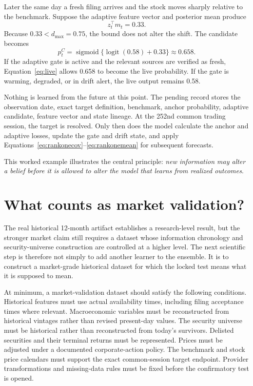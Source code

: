 \documentclass[11pt]{article}
\newcommand{\sigmoid}{\operatorname{sigmoid}}
\newcommand{\logit}{\operatorname{logit}}
\begin{document}
Later the same day a fresh filing arrives and the stock moves sharply relative to the benchmark. Suppose the adaptive feature vector and posterior mean produce
\begin{equation}
z_t^\top m_t=0.33.
\end{equation}
Because $0.33<d_{\max}=0.75$, the bound does not alter the shift. The candidate becomes
\begin{equation}
p_t^C=\sigmoid\{\logit(0.58)+0.33\}\approx0.658.
\end{equation}
If the adaptive gate is active and the relevant sources are verified as fresh, Equation~\eqref{eq:live} allows 0.658 to become the live probability. If the gate is warming, degraded, or in drift alert, the live output remains 0.58.

Nothing is learned from the future at this point. The pending record stores the observation date, exact target definition, benchmark, anchor probability, adaptive candidate, feature vector and state lineage. At the 252nd common trading session, the target is resolved. Only then does the model calculate the anchor and adaptive losses, update the gate and drift state, and apply Equations~\eqref{eq:rankonecov}--\eqref{eq:rankonemean} for subsequent forecasts.

This worked example illustrates the central principle: \emph{new information may alter a belief before it is allowed to alter the model that learns from realized outcomes}.

\section{What counts as market validation?}
\label{sec:realvalidation}

The real historical 12-month artifact establishes a research-level result, but the stronger market claim still requires a dataset whose information chronology and security-universe construction are controlled at a higher level. The next scientific step is therefore not simply to add another learner to the ensemble. It is to construct a market-grade historical dataset for which the locked test means what it is supposed to mean.

At minimum, a market-validation dataset should satisfy the following conditions. Historical features must use actual availability times, including filing acceptance times where relevant. Macroeconomic variables must be reconstructed from historical vintages rather than revised present-day values. The security universe must be historical rather than reconstructed from today's survivors. Delisted securities and their terminal returns must be represented. Prices must be adjusted under a documented corporate-action policy. The benchmark and stock price calendars must support the exact common-session target endpoint. Provider transformations and missing-data rules must be fixed before the confirmatory test is opened.
\end{document}
